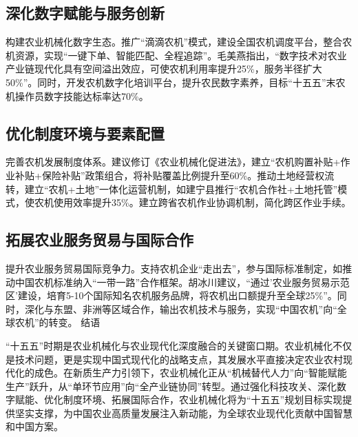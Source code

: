 \documentclass[12pt,fontset=windows]{ctexart}
\begin{document}
\subsection{深化数字赋能与服务创新}

构建农业机械化数字生态。推广“滴滴农机”模式，建设全国农机调度平台，整合农机资源，实现“一键下单、智能匹配、全程追踪”。毛美燕指出，“数字技术对农业产业链现代化具有空间溢出效应，可使农机利用率提升25\%，服务半径扩大50\%”\cite{MaoMeiYanShuZiJiShuDuiNongYeChanYeLianXianDaiHuaDeKongJianYiChuXiaoYingJiYingXiangJiZhi2025}。同时，开发农机数字化培训平台，提升农民数字素养，目标“十五五”末农机操作员数字技能达标率达70\%。

\subsection{优化制度环境与要素配置}

完善农机发展制度体系。建议修订《农业机械化促进法》，建立“农机购置补贴+作业补贴+保险补贴”政策组合，将补贴覆盖比例提升至60\%\cite{MaXuXinZhiShengChanLiQuDongNongYeNongCunXianDaiHuaJiLiZuZhiYuYouHua2025}。推动土地经营权流转，建立“农机+土地”一体化运营机制，如建宁县推行“农机合作社+土地托管”模式，使农机使用效率提升35\%\cite{FuHuaPingShenGengWoYeJiXianXingWoShiYiNongJiHuaGaiGeHuiJiuNongYeZhenXingXinTuJing2025}。建立跨省农机作业协调机制，简化跨区作业手续。

\subsection{拓展农业服务贸易与国际合作}

提升农业服务贸易国际竞争力。支持农机企业“走出去”，参与国际标准制定，如推动中国农机标准纳入“一带一路”合作框架。胡冰川建议，“通过'农业服务贸易示范区'建设，培育5-10个国际知名农机服务品牌，将农机出口额提升至全球25\%”\cite{HuBingChuanNongYeFuWuMaoYiYuQuanQiuNongYeGeJuChongSuShiWuWuShiQiZhongGuoDeZhanLueJiYu2025}。同时，深化与东盟、非洲等区域合作，输出农机技术与服务，实现“中国农机”向“全球农机”的转变。
结语

“十五五”时期是农业机械化与农业现代化深度融合的关键窗口期。农业机械化不仅是技术问题，更是实现中国式现代化的战略支点，其发展水平直接决定农业农村现代化的成色。在新质生产力引领下，农业机械化正从“机械替代人力”向“智能赋能生产”跃升，从“单环节应用”向“全产业链协同”转型。通过强化科技攻关、深化数字赋能、优化制度环境、拓展国际合作，农业机械化将为“十五五”规划目标实现提供坚实支撑，为中国农业高质量发展注入新动能，为全球农业现代化贡献中国智慧和中国方案。

\printbibliography
\end{document}

